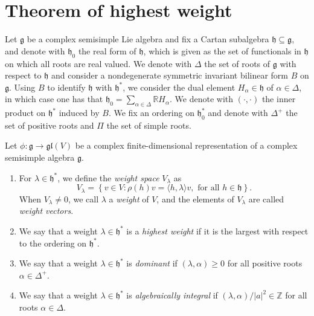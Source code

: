 \documentclass{report}
\begin{document}
\section{Theorem of highest weight}
Let $\mathfrak g$ be a complex semisimple Lie algebra and fix a Cartan subalgebra $\mathfrak h \subseteq \mathfrak g$, and denote with $\mathfrak h_0$ the real form of $\mathfrak h$, which is given as the set of functionals in $\mathfrak h$ on which all roots are real valued.
We denote with $\Delta$ the set of roots of $\mathfrak g$ with respect to $\mathfrak h$ and consider a nondegenerate symmetric invariant bilinear form $B$ on $\mathfrak g$.
Using $B$ to identify $\mathfrak h$ with $\mathfrak h^*$, we consider the dual element $H_\alpha \in \mathfrak h$ of $\alpha \in \Delta$, in which case one has that $\mathfrak h_0 = \sum_{\alpha \in \Delta} \mathbb R H_\alpha$.
We denote with $(\cdot, \cdot)$ the inner product on $\mathfrak h^*$ induced by $B$. We fix an ordering on $\mathfrak h_0^*$ and denote with $\Delta^+$ the set of positive roots and $\Pi$ the set of simple roots.
\begin{definition}
    Let $\phi : \mathfrak g \to \mathfrak{gl}(V)$ be a complex finite-dimensional representation of a complex semisimple algebra $\mathfrak g$.
    \begin{enumerate}[label = (\roman*)]
        \item For $\lambda \in \mathfrak h^*$, we define the \emph{weight space} $V_\lambda$ as
        \[
        V_\lambda = \left\{ v \in V : \rho(h)v = \langle h, \lambda \rangle v, \text{ for all } h \in \mathfrak h \right\}.
        \]
        When $V_\lambda \neq 0$, we call $\lambda$ a \emph{weight} of $V$, and the elements of $V_\lambda$ are called \emph{weight vectors}.
        \item We say that a weight $\lambda \in \mathfrak h^*$ is a \emph{highest weight} if it is the largest with respect to the ordering on $\mathfrak h^*$.
        \item We say that a weight $\lambda \in \mathfrak h^*$ is \emph{dominant} if $\left( \lambda, \alpha \right) \geq 0 $ for all positive roots $\alpha \in \Delta^+$.
        \item We say that a weight $\lambda \in \mathfrak h^*$ is \emph{algebraically integral} if $\left( \lambda, \alpha \right)/|a|^2 \in \mathbb Z$ for all roots $\alpha \in \Delta$.
    \end{enumerate}
\end{definition}
\end{document}
